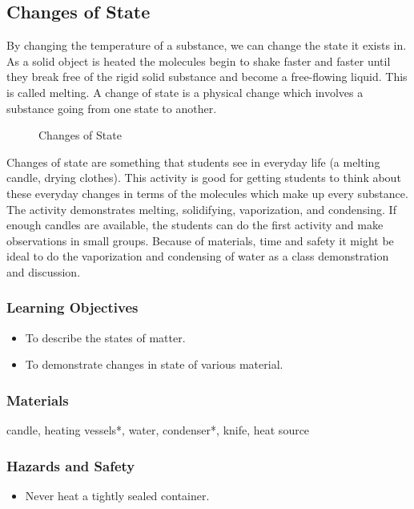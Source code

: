 \subsection{Changes of State}
By changing the temperature of a substance, we can change the state it exists in. As a solid object is heated the molecules begin to shake faster and faster until they break free of the rigid solid substance and become a free-flowing liquid. This is called melting. A change of state is a physical change which involves a substance going from one state to another. \\

\begin{figure}[h!]
\begin{center}
\def\svgwidth{250pt}

\caption{Changes of State}
\end{center}
\end{figure}

Changes of state are something that students see in everyday life (a melting candle, drying clothes). This activity is good for getting students to think about these everyday changes in terms of the molecules which make up every substance. The activity demonstrates melting, solidifying, vaporization, and condensing. If enough candles are available, the students can do the first activity and make observations in small groups. Because of materials, time and safety it might be ideal to do the vaporization and condensing of water as a class demonstration and discussion.

\subsubsection*{Learning Objectives}
\begin{itemize}
\item{To describe the states of matter.}
\item{To demonstrate changes in state of various material.}
\end{itemize}

\subsubsection*{Materials}
candle, heating vessels*, water, condenser*, knife, heat source

\subsubsection*{Hazards and Safety}
\begin{itemize}
\item{Never heat a tightly sealed container.}
\end{itemize}

